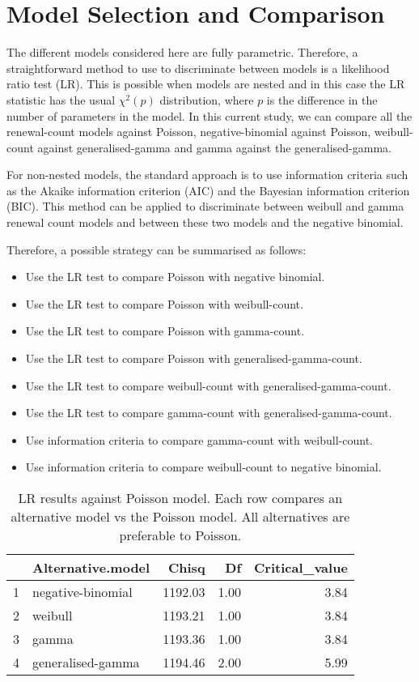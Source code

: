 \documentclass[a4paper,twoside,11pt]{article}
\begin{document}
\section{Model Selection and Comparison}
\label{sec:org084a744}

The different models considered here are fully parametric. Therefore, a
straightforward method to use to discriminate between models is a likelihood
ratio test (LR). This is possible when models are nested and in this case the LR
statistic has the usual \(\chi^2(p)\) distribution, where \(p\) is the difference in
the number of parameters in the model. In this current study, we can compare all
the renewal-count models against Poisson, negative-binomial against Poisson,
weibull-count against generalised-gamma and gamma against the generalised-gamma.

For non-nested models, the standard approach is to use information criteria such
as the Akaike information criterion (AIC) and the Bayesian information criterion
(BIC). This method can be applied to discriminate between weibull and gamma
renewal count models and between these two models and the negative binomial.

Therefore, a possible strategy can be summarised as follows:
\begin{itemize}
\item Use the LR test to compare Poisson with negative binomial.
\item Use the LR test to compare Poisson with weibull-count.
\item Use the LR test to compare Poisson with gamma-count.
\item Use the LR test to compare Poisson with generalised-gamma-count.
\item Use the LR test to compare weibull-count with generalised-gamma-count.
\item Use the LR test to compare gamma-count with generalised-gamma-count.
\item Use information criteria to compare gamma-count with weibull-count.
\item Use information criteria to compare weibull-count to negative binomial.
\end{itemize}

\begin{table}[ht]
\centering
\begin{tabular}{rlrrr}
  \hline
 & Alternative.model & Chisq & Df & Critical\_value \\ 
  \hline
1 & negative-binomial & 1192.03 & 1.00 & 3.84 \\ 
  2 & weibull & 1193.21 & 1.00 & 3.84 \\ 
  3 & gamma & 1193.36 & 1.00 & 3.84 \\ 
  4 & generalised-gamma & 1194.46 & 2.00 & 5.99 \\ 
   \hline
\end{tabular}
\caption{LR results against Poisson model. Each row compares an alternative model vs the Poisson model. All alternatives are preferable to Poisson.} 
\label{tab:lr_pois}
\end{table}
\end{document}
